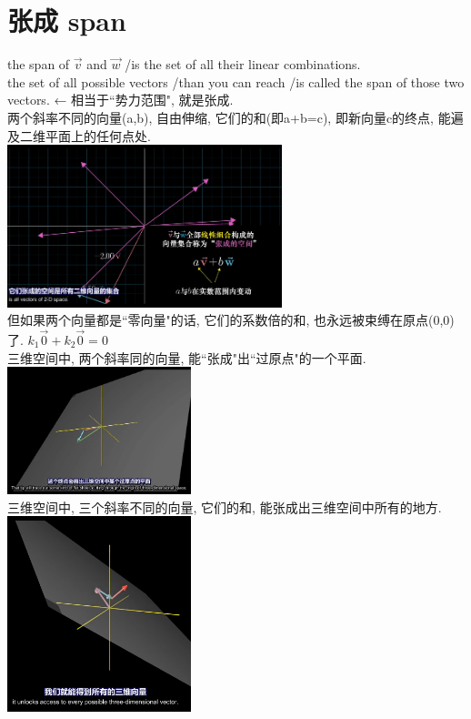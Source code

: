 \documentclass[UTF8]{ctexart}
\begin{document}
	\section{张成 span}
	
	the span of $\vec{v}$ and $\vec{w} $  /is the set of  all their linear combinations.\\	
	the set of all possible vectors /than you can reach /is called the span of those two vectors. ← 相当于``势力范围", 就是张成.\\
	
	
	两个斜率不同的向量(a,b), 自由伸缩, 它们的和(即a+b=c), 即新向量c的终点, 能遍及二维平面上的任何点处.\\
	
		\includegraphics[width=0.6\textwidth]{img/0070.png}\\	
	
	但如果两个向量都是``零向量"的话, 它们的系数倍的和, 也永远被束缚在原点(0,0)了. $ k_1 \vec{0}  +  k_2 \vec{0}=0$ \\
	
	三维空间中, 两个斜率同的向量, 能``张成"出``过原点"的一个平面.\\	
			\includegraphics[width=0.4\textwidth]{img/0071.png}\\
			
	三维空间中, 三个斜率不同的向量, 它们的和, 能张成出三维空间中所有的地方. \\			
			\includegraphics[width=0.4\textwidth]{img/0072.png}\\
	
\end{document}

